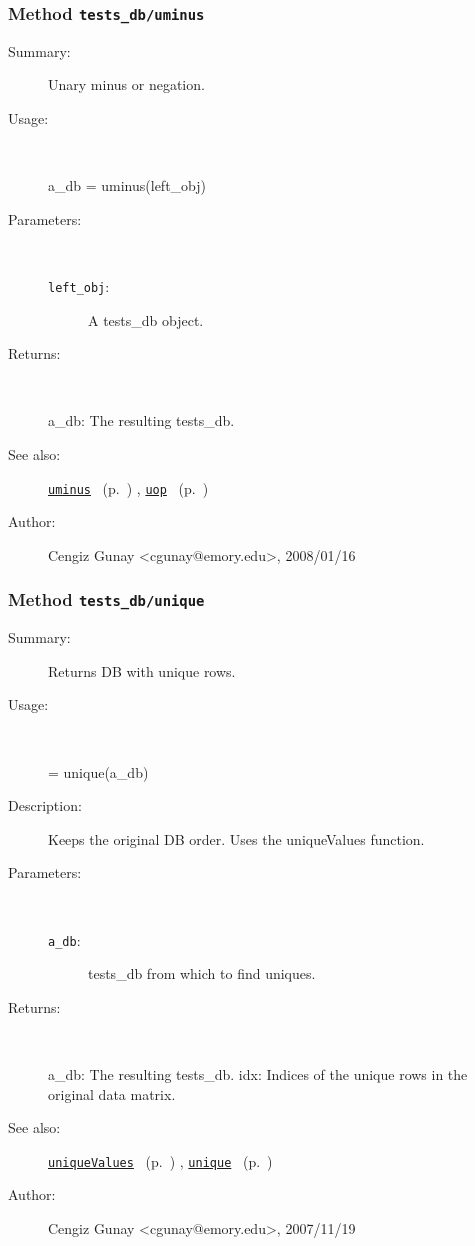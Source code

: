 \subsubsection[Method \texttt{uminus}]{Method \texttt{tests\_db/uminus}}%
%
\label{ref_tests_db__uminus}%
\hypertarget{ref_tests_db__uminus}{}%
\begin{description}
\item[Summary:]Unary minus or negation.
%
\item[Usage:]~%
\begin{lyxcode}%
a\_db = uminus(left\_obj)
%
\end{lyxcode}%
%
%
\item[Parameters:]~
\begin{description}%
\item[\texttt{left\_obj}:]
 A tests\_db object.
\end{description}%
%
\item[Returns:
]~

	a\_db: The resulting tests\_db.
%
%
\item[See also:]%
\hyperlink{ref_uminus}{\texttt{uminus}}%
\ (p.~\pageref{ref_uminus})%
%
, \hyperlink{ref_uop}{\texttt{uop}}%
\ (p.~\pageref{ref_uop})%
%
%
\item[Author:]%
Cengiz Gunay <cgunay@emory.edu>, 2008/01/16
%
\end{description}
\methodline%
\subsubsection[Method \texttt{unique}]{Method \texttt{tests\_db/unique}}%
%
\label{ref_tests_db__unique}%
\hypertarget{ref_tests_db__unique}{}%
\begin{description}
\item[Summary:]Returns DB with unique rows.
%
\item[Usage:]~%
\begin{lyxcode}%
[a\_db idx] = unique(a\_db)
%
\end{lyxcode}%
%
\item[Description:]%
Keeps the original DB order. Uses the uniqueValues function.
\item[Parameters:]~
\begin{description}%
\item[\texttt{a\_db}:]
 tests\_db from which to find uniques.
\end{description}%
%
\item[Returns:
]~

   a\_db: The resulting tests\_db.
   idx: Indices of the unique rows in the original data matrix.
%
%
\item[See also:]%
\hyperlink{ref_uniqueValues}{\texttt{uniqueValues}}%
\ (p.~\pageref{ref_uniqueValues})%
%
, \hyperlink{ref_unique}{\texttt{unique}}%
\ (p.~\pageref{ref_unique})%
%
%
\item[Author:]%
Cengiz Gunay <cgunay@emory.edu>, 2007/11/19
%
\end{description}
\methodline%
